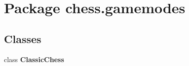 \section{Package chess.\+gamemodes}
\label{namespacechess_1_1gamemodes}
\subsection*{Classes}
\begin{DoxyCompactItemize}
\item 
class {\bf Classic\+Chess}
\end{DoxyCompactItemize}
